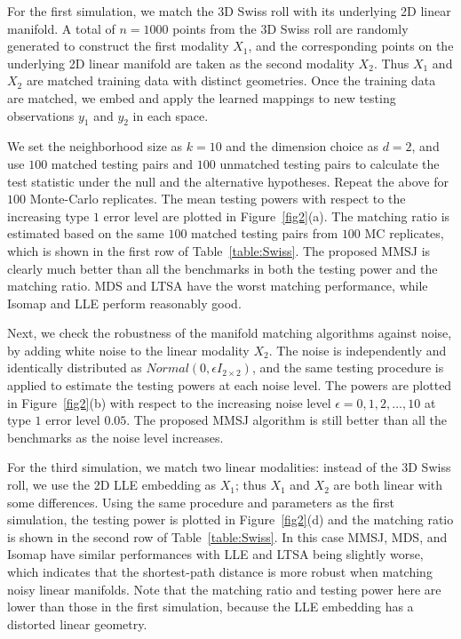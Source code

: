 \documentclass[times,twocolumn,final]{elsarticle}
\begin{document}
For the first simulation, we match the 3D Swiss roll with its underlying 2D linear manifold. A total of $n=1000$ points from the 3D Swiss roll are randomly generated to construct the first modality $X_{1}$, and the corresponding points on the underlying 2D linear manifold are taken as the second modality $X_{2}$. Thus $X_{1}$ and $X_{2}$ are matched training data with distinct geometries. Once the training data are matched, we embed and apply the learned mappings to new testing observations $y_{1}$ and $y_{2}$ in each space.

We set the neighborhood size as $k=10$ and the dimension choice as $d=2$, and use $100$ matched testing pairs and $100$ unmatched testing pairs to calculate the test statistic under the null and the alternative hypotheses. Repeat the above for $100$ Monte-Carlo replicates. The mean testing powers with respect to the increasing type $1$ error level are plotted in Figure~\ref{fig2}(a). The matching ratio is estimated based on the same $100$ matched testing pairs from $100$ MC replicates, which is shown in the first row of Table~\ref{table:Swiss}. The proposed MMSJ is clearly much better than all the benchmarks in both the testing power and the matching ratio. MDS and LTSA have the worst matching performance, while Isomap and LLE perform reasonably good.

Next, we check the robustness of the manifold matching algorithms against noise, by adding white noise to the linear modality $X_{2}$. The noise is independently and identically distributed as $Normal(0, \epsilon I_{2 \times 2})$, and the same testing procedure is applied to estimate the testing powers at each noise level. The powers are plotted in Figure~\ref{fig2}(b) with respect to the increasing noise level $\epsilon = 0,1,2,\ldots,10$ at type $1$ error level $0.05$. The proposed MMSJ algorithm is still better than all the benchmarks as the noise level increases.

For the third simulation, we match two linear modalities: instead of the 3D Swiss roll, we use the 2D LLE embedding as $X_{1}$; thus $X_{1}$ and $X_{2}$ are both linear with some differences. Using the same procedure and parameters as the first simulation, the testing power is plotted in Figure~\ref{fig2}(d) and the matching ratio is shown in the second row of Table~\ref{table:Swiss}. In this case MMSJ, MDS, and Isomap have similar performances with LLE and LTSA being slightly worse, which indicates that the shortest-path distance is more robust when matching noisy linear manifolds. Note that the matching ratio and testing power here are lower than those in the first simulation, because the LLE embedding has a distorted linear geometry. 
\end{document}
